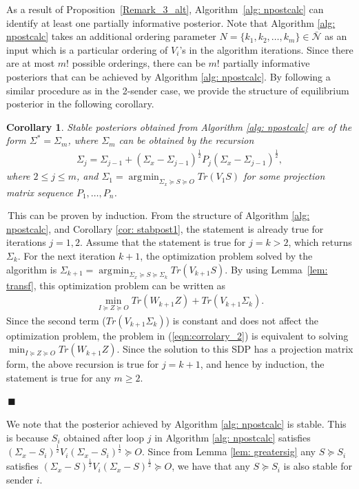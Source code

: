\documentclass[12pt,journal,onecolumn]{IEEEtran}
\newtheorem{corollary}{Corollary}
\newenvironment{Proof}[1]{\medskip\par\noindent{\bf Proof:\,}\,#1}{{\mbox{\,$\blacksquare$}\par}}
\DeclareMathOperator*{\argmin}{\arg\!\min}
\begin{document}
As a result of Proposition~\ref{Remark_3_alt}, Algorithm~\ref{alg: npostcalc} can identify at least one partially informative posterior. %
Note that Algorithm \ref{alg: npostcalc} takes an additional ordering parameter $N=\{k_1,k_2,\dots,k_m\}\in\bar{\mathcal{N}}$ as an input which is a particular ordering of $V_i$'s in the algorithm iterations. Since there are at most $m!$ possible orderings, there can be $m!$ partially informative posteriors that can be achieved by Algorithm \ref{alg: npostcalc}. By following a similar procedure as in the 2-sender case, we provide the structure of equilibrium posterior in the following corollary. 
\begin{corollary}\label{cor: npoststruct}
Stable posteriors obtained from Algorithm \ref{alg: npostcalc} are of the form $\Sigma^*=\Sigma_m$, where $\Sigma_m$ can be obtained by the recursion
\begin{align}
    \Sigma_j=\Sigma_{j-1}+(\Sigma_x-\Sigma_{j-1})^{\frac{1}{2}}P_j(\Sigma_x-\Sigma_{j-1})^\frac{1}{2},
\end{align}
where $2\leq j \leq m $, and $\Sigma_1=\argmin_{\Sigma_x\succeq S\succeq O}Tr(V_1S)$ for some projection matrix sequence $P_1,\hdots, P_n$.
\end{corollary}
\begin{Proof}
This can be proven by induction. From the structure of Algorithm \ref{alg: npostcalc}, and Corollary \ref{cor: stabpost1}, the statement is already true for iterations $j=1,2$. Assume that the statement is true for $j=k> 2$, which returns $\Sigma_k$. For the next iteration $k+1$, the optimization problem solved by the algorithm is $\Sigma_{k+1}=\argmin_{\Sigma_x\succeq S\succeq\Sigma_k}Tr(V_{k+1}S)$. By using Lemma~\ref{lem: transf}, this optimization problem can be written as 
\begin{align}\label{eqn:corrolary_2}
    \min_{I\succeq Z\succeq O} Tr(W_{k+1}Z)+Tr(V_{k+1}\Sigma_k).
\end{align}
Since the second term ($Tr(V_{k+1}\Sigma_k)$) is constant and does not affect the optimization problem, the problem in (\ref{eqn:corrolary_2}) is equivalent to solving $\min_{I\succeq Z\succeq O} Tr(W_{k+1}Z)$. Since the solution to this SDP has a projection matrix form, the above recursion is true for $j=k+1$, and hence by induction, the statement is true for any $m\geq 2$.
\end{Proof}
We note that the posterior achieved by Algorithm \ref{alg: npostcalc} is stable. This is because $S_i$ obtained after loop $j$ in Algorithm \ref{alg: npostcalc} satisfies $(\Sigma_x-S_i)^{\frac{1}{2}}V_i(\Sigma_x-S_i)^{\frac{1}{2}}\succeq O$. Since from Lemma \ref{lem: greatersig} any $S\succeq S_i$ satisfies $(\Sigma_x-S)^{\frac{1}{2}}V_i(\Sigma_x-S)^{\frac{1}{2}}\succeq O$, we have that any $S\succeq S_i$ is also stable for sender $i$. 
\end{document}
